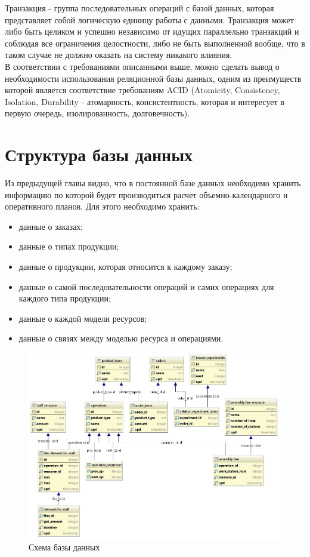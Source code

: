 \indent Транзакция - группа последовательных операций с базой данных, которая представляет собой логическую единицу работы с данными.
Транзакция может либо быть целиком и успешно независимо от идущих параллельно транзакций и соблюдая все ограничения целостности, либо не быть выполненной вообще, что в таком случае не должно оказать на систему никакого влияния.\\
\indent В соответствии с требованиями описанными выше, можно сделать вывод о необходимости использования реляционной базы данных, одним из преимуществ которой является соответствие требованиям ACID (Atomicity, Consistency, Isolation, Durability - атомарность, консистентность, которая и интересует в первую очередь, изолированность, долговечность).

\section{Структура базы данных}

\indent Из предыдущей главы видно, что в постоянной базе данных необходимо хранить информацию по которой будет производиться расчет объемно-календарного и оперативного планов.
Для этого необходимо хранить:

\begin{itemize}
	\item данные о заказах;
	\item данные о типах продукции;
	\item данные о продукции, которая относится к каждому заказу;
	\item данные о самой последовательности операций и самих операциях для каждого типа продукции;
	\item данные о каждой модели ресурсов;
	\item данные о связях между моделью ресурса и операциями.
\end{itemize}

\begin{figure}[ht]	
	\centering	
	\includegraphics[width=\linewidth]{pics/databaseSchema.png}
	\caption{Схема базы данных}
	\label{fig:dbSchema}
\end{figure}


